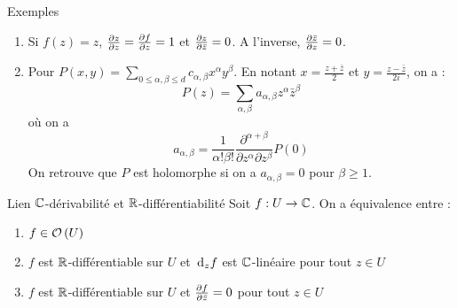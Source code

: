 \documentclass{cours}
\begin{document}
\begin{propositionfr}{Exemples}{}
	\begin{enumerate}
		\item Si $f\left(z\right) = z$, $\frac{\partial z}{\partial z} = \frac{\partial f}{\partial z} = 1$ et $\frac{\partial z}{\partial \bar{z}} = 0$. A l'inverse, $\frac{\partial \bar{z}}{\partial z} = 0$.
		\item Pour $P\left(x, y\right) = \sum_{0 \leq \alpha, \beta\leq d}c_{\alpha, \beta}x^{\alpha}y^{\beta}$. En notant $x = \frac{z + \bar{z}}{2}$ et $y = \frac{z - \bar{z}}{2i}$, on a : 
			\begin{equation*}
				P\left(z\right) = \sum_{\alpha, \beta}a_{\alpha, \beta}z^{\alpha}\bar{z}^{\beta}
			\end{equation*}
			où on a 
			\begin{equation*}	
				a_{\alpha, \beta} = \frac{1}{\alpha!\beta!}\frac{\partial^{\alpha + \beta}}{\partial z^{\alpha}\partial z^{\beta}}P\left(0\right)
			\end{equation*}
			On retrouve que $P$ est holomorphe si on a $a_{\alpha, \beta} = 0$ pour $\beta \geq 1$. 
	\end{enumerate}
\end{propositionfr}

\begin{théorème}{Lien $\mathbb{C}$-dérivabilité et $\mathbb{R}$-différentiabilité}{}
	Soit $f : U \to \mathbb{C}$. On a équivalence entre : 
	\begin{enumerate}
		\item $f \in \mathcal{O}\left(U\right)$
		\item $f$ est $\mathbb{R}$-différentiable sur $U$ et ${\rm \, d}_{z} f$ est $\mathbb{C}$-linéaire pour tout $z \in U$
		\item $f$ est $\mathbb{R}$-différentiable sur $U$ et $\frac{\partial f}{\partial \bar{z}} = 0$ pour tout $z \in U$
	\end{enumerate}
\end{théorème}
\end{document}

